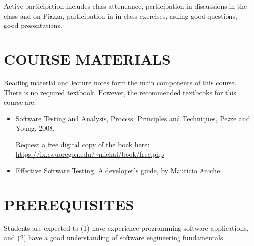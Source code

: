\documentclass [11pt]{article}
\newcommand{\compresslist}{%
  \setlength{\itemsep}{1pt}%
  \setlength{\parskip}{0pt}%
  \setlength{\parsep}{0pt}%
}
\begin{document}
Active participation includes class attendance, participation in discussions in the class and on Piazza, participation in in-class exercises, asking good questions, good presentations. %


	

	
\section*{COURSE MATERIALS}

Reading material and lecture notes form the main components of this course. There is no required textbook. However, the recommended textbooks for this course are:
  
  \begin{itemize}
  \compresslist

  \item Software Testing and Analysis, Process, Principles and Techniques, Pezze and Young, 2008. 
	
	Request a free digital copy of the book here:\\
\url{https://ix.cs.uoregon.edu/~michal/book/free.php}\\	
	


    \item Effective Software Testing, A developer's guide, by Mauricio Aniche

	
	  \end{itemize}
	  

\section*{PREREQUISITES}
Students are expected to (1) have experience programming software applications, and  (2) have a good understanding of software engineering fundamentals.
\end{document}
